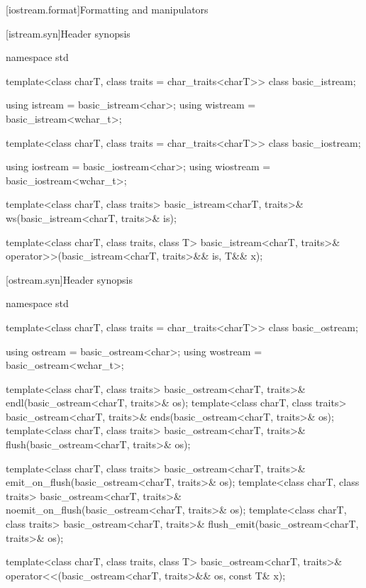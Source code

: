 [iostream.format]{Formatting and manipulators}

[istream.syn]{Header  synopsis}
%

\begin{codeblock}
namespace std {
  template<class charT, class traits = char_traits<charT>>
    class basic_istream;

  using istream  = basic_istream<char>;
  using wistream = basic_istream<wchar_t>;

  template<class charT, class traits = char_traits<charT>>
    class basic_iostream;

  using iostream  = basic_iostream<char>;
  using wiostream = basic_iostream<wchar_t>;

  template<class charT, class traits>
    basic_istream<charT, traits>& ws(basic_istream<charT, traits>& is);

  template<class charT, class traits, class T>
    basic_istream<charT, traits>& operator>>(basic_istream<charT, traits>&& is, T&& x);
}
\end{codeblock}

%
%
%
%

[ostream.syn]{Header  synopsis}
%

\begin{codeblock}
namespace std {
  template<class charT, class traits = char_traits<charT>>
    class basic_ostream;

  using ostream  = basic_ostream<char>;
  using wostream = basic_ostream<wchar_t>;

  template<class charT, class traits>
    basic_ostream<charT, traits>& endl(basic_ostream<charT, traits>& os);
  template<class charT, class traits>
    basic_ostream<charT, traits>& ends(basic_ostream<charT, traits>& os);
  template<class charT, class traits>
    basic_ostream<charT, traits>& flush(basic_ostream<charT, traits>& os);

  template<class charT, class traits>
    basic_ostream<charT, traits>& emit_on_flush(basic_ostream<charT, traits>& os);
  template<class charT, class traits>
    basic_ostream<charT, traits>& noemit_on_flush(basic_ostream<charT, traits>& os);
  template<class charT, class traits>
    basic_ostream<charT, traits>& flush_emit(basic_ostream<charT, traits>& os);

  template<class charT, class traits, class T>
    basic_ostream<charT, traits>& operator<<(basic_ostream<charT, traits>&& os, const T& x);
}
\end{codeblock}

